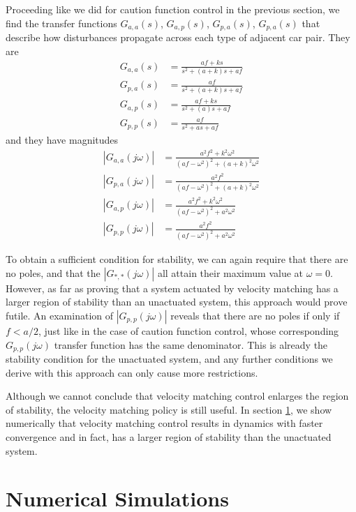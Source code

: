 \documentclass[10pt,twocolumn]{article}
\theoremstyle{ss}
\begin{document}
Proceeding like we did for caution function control in the previous section, we find the transfer functions $G_{a,a}(s)$, $G_{a,p}(s)$, $G_{p,a}(s)$, $G_{p,a}(s)$ that describe how disturbances propagate across each type of adjacent car pair. They are
\begin{align}
G_{a,a}(s) &= \frac{af + ks}{s^2 + (a+k)s + af}\\
G_{p,a}(s) &= \frac{af}{s^2 + (a+k)s + af}\\
G_{a,p}(s) &= \frac{af + ks}{s^2 + (a)s + af}\\
G_{p,p}(s) &= \frac{af}{s^2 + as + af}
\end{align}
and they have magnitudes
\begin{align}
|G_{a,a}(j\omega)| &= \frac{a^2f^2 + k^2\omega^2}{(af - \omega^2)^2 + (a+k)^2\omega^2}\\
|G_{p,a}(j\omega)| &= \frac{a^2f^2}{(af - \omega^2)^2 + (a+k)^2\omega^2}\\
|G_{a,p}(j\omega)| &= \frac{a^2f^2 + k^2\omega^2}{(af - \omega^2)^2 + a^2\omega^2}\\
|G_{p,p}(j\omega)| &= \frac{a^2f^2}{(af - \omega^2)^2 + a^2\omega^2}
\end{align}

To obtain a sufficient condition for stability, we can again require that there are no poles, and that the $|G_{*,*}(j\omega)|$ all attain their maximum value at $\omega=0$. However, as far as proving that a system actuated by velocity matching has a larger region of stability than an unactuated system, this approach would prove futile. An examination of $|G_{p,p}(j\omega)|$ reveals that there are no poles if only if $f < a/2$, just like in the case of caution function control, whose corresponding $G_{p,p}(j\omega)$ transfer function has the same denominator. This is already the stability condition for the unactuated system, and any further conditions we derive with this approach can only cause more restrictions. 

Although we cannot conclude that velocity matching control enlarges the region of stability, the velocity matching policy is still useful. In section \ref{sec:numer}, we show numerically that velocity matching control results in dynamics with faster convergence and in fact, has a larger region of stability than the unactuated system.

\section{Numerical Simulations}
\label{sec:numer}
\end{document}
